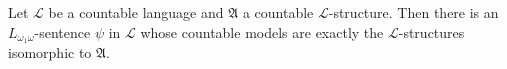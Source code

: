 Let $\mathcal{L}$ be a countable language and $\mathfrak{A}$ a countable $\mathcal{L}$-structure. Then there is an $L_{\omega_1\omega}$-sentence $\psi$ in $\mathcal{L}$ whose countable models are exactly the $\mathcal{L}$-structures isomorphic to $\mathfrak{A}$.
